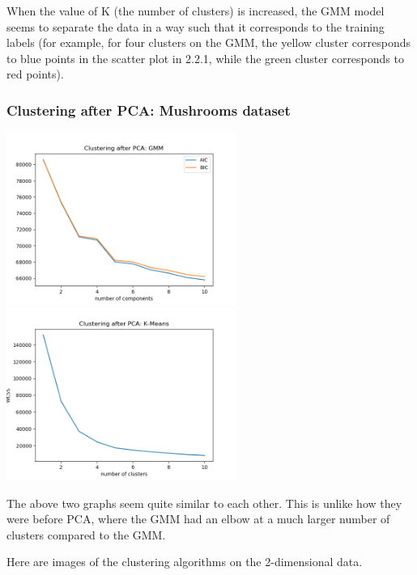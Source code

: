 \documentclass[11pt]{article}
\begin{document}
            When the value of K (the number of clusters) is increased, the GMM model
            seems to separate the data in a way such that it corresponds to the training labels
            (for example, for four clusters on the GMM, the yellow cluster corresponds
            to blue points in the scatter plot in 2.2.1, while the green cluster corresponds
            to red points).

            \subsubsection{Clustering after PCA: Mushrooms dataset}
            
            \includegraphics[width=7.5cm]{../mushrooms/clustering2/gmm_pca.png}
            \includegraphics[width=7.5cm]{../mushrooms/clustering2/km_pca.png}

            The above two graphs seem quite similar to each other. This is unlike how
            they were before PCA, where the GMM had an elbow at a much larger number
            of clusters compared to the GMM.

            Here are images of the clustering algorithms on the 2-dimensional data.
\end{document}
